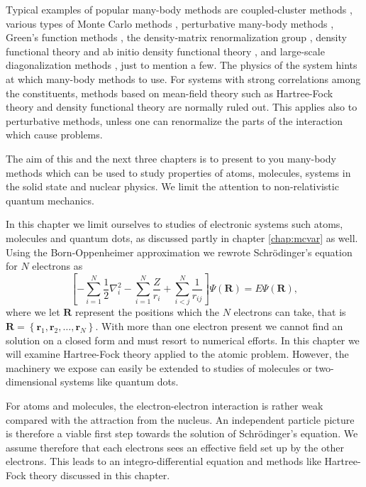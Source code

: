 Typical examples of 
popular many-body methods are coupled-cluster methods 
\cite{kummel1978,bartlett2007,helgaker,dean2004,Kowalski2004}, 
various types of 
Monte Carlo methods \cite{Pudliner1997,kdl1997,ceperley1995}, 
perturbative many-body methods \cite{ellis1977,lindgren,hko1995}, 
Green's function methods \cite{dickhoff,blaizot},  
the density-matrix renormalization group \cite{white1992,schollwock2005}, density functional theory \cite{jones1989} and 
ab initio density functional theory \cite{bartlett2005,peirs2003,vanneck2006}, and large-scale diagonalization methods 
\cite{Whitehead1977,caurier2005,horoi2006}, just to mention a few. 
The physics of the system hints at which many-body methods to use. For systems with strong correlations
among the constituents, methods based on mean-field theory such as Hartree-Fock theory and density functional theory are normally ruled out.
This applies also to perturbative methods, unless one can renormalize the parts of the interaction which cause problems.

The aim of this and the next three chapters is to present to you many-body methods
which can be used to study properties of atoms, molecules, systems in the solid state 
and nuclear physics. We limit the attention to non-relativistic quantum mechanics.

In this chapter
we limit ourselves to studies of electronic systems such atoms, molecules and quantum dots, 
as discussed partly in chapter \ref{chap:mcvar} as well.
Using the Born-Oppenheimer approximation we rewrote Schr\"odinger's equation for $N$ electrons as 
\[
  \left[-\sum_{i=1}^N \frac{1}{2} \nabla^2_i 
    - \sum_{i=1}^N \frac{Z}{r_i} + \sum_{i<j}^N \frac{1}{r_{ij}} 
    \right] \Psi(\mathbf{R}) = E \Psi(\mathbf{R}), 
\]
where we let $\mathbf{R}$ represent the positions which the $N$ electrons can take, that is $\mathbf{R}=\left\{\mathbf{r}_1,\mathbf{r}_2,\dots,\mathbf{r}_N\right\}$. 
With more than one electron present we cannot find an solution on a closed form and must resort to numerical efforts. In this
chapter we will examine Hartree-Fock theory 
applied to the atomic problem. However, the machinery we expose can easily be extended to studies of molecules or two-dimensional systems like quantum dots.

For atoms and molecules, the electron-electron interaction 
is rather weak compared with the attraction from the nucleus. An independent particle picture
is therefore a viable first step towards the solution of Schr\"odinger's equation. 
We assume therefore that each electrons sees an effective field set up by the other electrons.
This leads to an integro-differential equation  and methods like Hartree-Fock theory discussed in this chapter.


